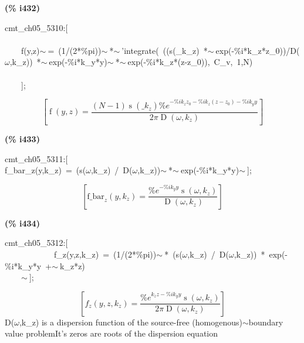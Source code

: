 \documentclass[fleqn]{article}
\begin{document}
\noindent
\begin{minipage}[t]{4.000000em}\color{red}\bfseries
(\% i432)	
\end{minipage}
\begin{minipage}[t]{\textwidth}\color{blue}
cmt\_ch05\_5310:[\\
\\
\ \ \ \ f(y,z)\ensuremath{\sim\ }=\ (1/(2*\%pi))\ensuremath{\sim\ }*\ensuremath{\sim\ }'integrate(\ ((s(\_k\_z)\ *\ensuremath{\sim\ }exp(-\%i*k\_z*z\_0))/D(\ensuremath{\omega},k\_z))\ *\ensuremath{\sim\ }exp(-\%i*k\_y*y)\ensuremath{\sim\ }*\ensuremath{\sim\ }exp(-\%i*k\_z*(z-z\_0)),\ C\_v,\ 1,N)\\
\ \ \ \ \\
\ \ \ \ ];
\end{minipage}
\[\displaystyle \tag{\% o432} 
\left[ \operatorname{f}\left( y\operatorname{,}z\right) =\frac{\left( N-1\right)  \operatorname{s}\left( {{\_ k}_z}\right)  {{\% e}^{-\% i {k_z} {z_0}-\% i {k_z} \left( z-{z_0}\right) -\% i {k_y} y}}}{2 \ensuremath{\pi}  \operatorname{D}\left( \omega \operatorname{,}{k_z}\right) }\right] \mbox{}
\]


\noindent
\begin{minipage}[t]{4.000000em}\color{red}\bfseries
(\% i433)	
\end{minipage}
\begin{minipage}[t]{\textwidth}\color{blue}
cmt\_ch05\_5311:[\\
f\_bar\_z(y,k\_z)\ =\ (s(\ensuremath{\omega},k\_z)\ /\ D(\ensuremath{\omega},k\_z))\ensuremath{\sim\ }*\ensuremath{\sim\ }exp(-\%i*k\_y*y)\ensuremath{\sim\ }];
\end{minipage}
\[\displaystyle \tag{\% o433} 
\left[ {{\ensuremath{\mathrm{f\_ bar}}}_z}\left( y\operatorname{,}{k_z}\right) =\frac{{{\% e}^{-\% i {k_y} y}} \operatorname{s}\left( \omega \operatorname{,}{k_z}\right) }{\operatorname{D}\left( \omega \operatorname{,}{k_z}\right) }\right] \mbox{}
\]


\noindent
\begin{minipage}[t]{4.000000em}\color{red}\bfseries
(\% i434)	
\end{minipage}
\begin{minipage}[t]{\textwidth}\color{blue}
cmt\_ch05\_5312:[\ \\
\ \ \ \ \ \ \ \ \ \ \ \ f\_z(y,z,k\_z)\ =\ (1/(2*\%pi))\ensuremath{\sim\ }*\ (s(\ensuremath{\omega},k\_z)\ /\ D(\ensuremath{\omega},k\_z))\ *\ exp(-\%i*k\_y*y\ +\ensuremath{\sim\ }k\_z*z)\ \\
\ \ \ \ \ensuremath{\sim\ }];
\end{minipage}
\[\displaystyle \tag{\% o434} 
\left[ {f_z}\left( y\operatorname{,}z\operatorname{,}{k_z}\right) =\frac{{{\% e}^{{k_z} z-\% i {k_y} y}} \operatorname{s}\left( \omega \operatorname{,}{k_z}\right) }{2 \ensuremath{\pi}  \operatorname{D}\left( \omega \operatorname{,}{k_z}\right) }\right] \mbox{}
\]
D(\ensuremath{\omega},k\_z) is a dispersion function of the source-free (homogenous)\ensuremath{\sim }boundary value problemIt's zeros are roots of the dispersion equation
\end{document}
